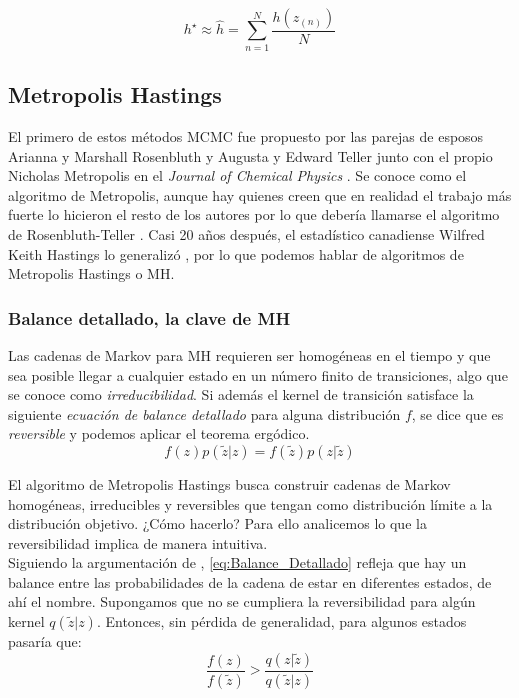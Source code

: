 \begin{equation*}
h^\star \approx \hat{h} = \sum\limits_{n=1}^N \dfrac{h(z_{(n)})}{N}
\end{equation*}

\subsection{Metropolis Hastings}

 El primero de estos métodos MCMC fue propuesto por las parejas de esposos Arianna y Marshall Rosenbluth y Augusta y Edward Teller junto con el propio Nicholas Metropolis en el \textit{Journal of Chemical Physics} \parencite{Metropolis53}. Se conoce como el algoritmo de Metropolis, aunque hay quienes creen que en realidad el trabajo más fuerte lo hicieron el resto de los autores por lo que debería llamarse el algoritmo de Rosenbluth-Teller \parencite{Gubernatis05}. Casi 20 años después, el estadístico canadiense Wilfred Keith Hastings lo generalizó \parencite{Hastings70}, por lo que podemos hablar de algoritmos de Metropolis Hastings o MH.

\subsubsection*{Balance detallado, la clave de MH}
 
Las cadenas de Markov para MH requieren ser homogéneas en el tiempo y que sea posible llegar a cualquier estado en un número finito de transiciones, algo que se conoce como \textit{irreducibilidad}. Si además el kernel de transición satisface la siguiente \textit{ecuación de balance detallado} para alguna distribución $f$, se dice que es \textit{reversible} y podemos aplicar el teorema ergódico.
\begin{equation}
\label{eq:Balance_Detallado}
f(z)p(\tilde{z}|z)=f(\tilde{z})p(z|\tilde{z})
\end{equation}

El algoritmo de Metropolis Hastings busca construir cadenas de Markov homogéneas, irreducibles y reversibles que tengan como distribución límite a la distribución objetivo. ¿Cómo hacerlo? Para ello analicemos lo que la reversibilidad implica de manera intuitiva.\\

Siguiendo la argumentación de \textcite{ChibGreenberg95}, \eqref{eq:Balance_Detallado} refleja que hay un balance entre las probabilidades de la cadena de estar en diferentes estados, de ahí el nombre. Supongamos que no se cumpliera la reversibilidad para algún kernel $q(\tilde{z}|z)$. Entonces, sin pérdida de generalidad, para algunos estados pasaría que:
\begin{equation}
\label{eq:Inbalance_Detallado}
\dfrac{f(z)}{f(\tilde{z})}>\dfrac{q(z|\tilde{z})}{q(\tilde{z}|z)}
\end{equation}


